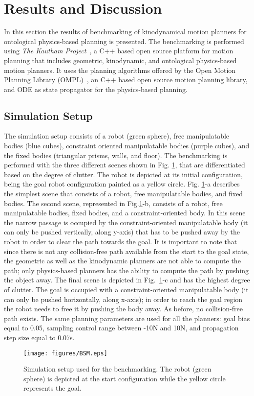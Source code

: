 \documentclass[runningheads,a4paper]{llncs}
\begin{document}
\section{Results and Discussion}
In this section  the results of benchmarking of kinodynamical motion planners for ontological physics-based planning is  presented. The benchmarking is performed using
\textit{The Kautham Project}~\cite{Rosell2014},  a C++ based open source platform for  motion planning that includes geometric, kinodynamic, and ontological physics-based motion planners.
It uses the planning algorithms offered by the Open Motion Planning Library (OMPL)~\cite{sucan201}, an  C++ based open source motion planning library, and ODE as state
propagator for the physics-based planning.

\subsection{Simulation Setup}
The simulation setup consists of a robot (green sphere), free manipulatable bodies (blue cubes), constraint oriented manipulatable bodies
(purple cubes), and the fixed bodies
(triangular prisms, walls, and floor). The benchmarking is performed with the three different scenes shown in Fig. \ref{fig:scenes}, that are
differentiated based on the degree of clutter. The robot is depicted at its initial configuration, being the goal robot configuration painted as a yellow circle.
Fig. \ref{fig:scenes}-a describes the simplest scene that consists of a robot, free manipulatable bodies, and fixed bodies. The second scene, represented in
Fig.\ref{fig:scenes}-b, consists of a robot, free manipulatable bodies, fixed bodies, and a constraint-oriented body. In this scene the narrow passage is occupied by the
constraint-oriented manipulatable body (it can only be pushed vertically, along y-axis) that has to be pushed away by the robot in order to clear the path towards the goal.
It is important to note that since there is not any collision-free path available from the start to the goal state, the geometric as well as the kinodynamic planners
are not able to compute the path; only physics-based planners has the ability to compute the path by pushing the object away. The final scene is depicted in Fig.~\ref{fig:scenes}-c and
has the highest degree of clutter. The goal is occupied with a constraint-oriented manipulatable body (it can only be pushed horizontally, along \hbox{x-axis);} 
in order to reach the goal region the robot needs to free it by pushing the body away. As before, no collision-free path exists. The same planning parameters
are used for all the planners: goal bias equal to 0.05, sampling control range between -10N and 10N, and propagation step size equal to 0.07s.
\begin{figure}[!h]
\begin{center}
\texttt{[image: figures/BSM.eps]}%
\caption{Simulation setup  used for the benchmarking. The robot (green sphere) is depicted at the start configuration while the yellow circle represents the goal.}\label{fig:scenes}
\vspace{-6mm}
\end{center}
\end{figure}
\vspace{-4mm}
\end{document}
